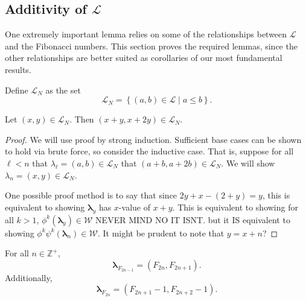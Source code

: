 \documentclass[11pt, letterpaper]{article}
\begin{document}
\subsection{Additivity of $\mathcal{L} $}
One extremely important lemma relies on some of the relationships between $\mathcal{L} $ and the Fibonacci numbers. This section proves the required lemmas, since the other relationships are better suited as corollaries of our most fundamental results.
\begin{definition}\label{dfn:12}
	Define $\mathcal{L} _N$ as the set
	\[
\mathcal{L} _N = \left\{ (a,b)\in \mathcal{L}  \mid a\leq b \right\} 
	.\]	
\end{definition}
\begin{lemma}[Additivity]\label{lma:5}
	Let $(x,y)\in \mathcal{L}_N$. Then $(x+y,x+2y)\in \mathcal{L}_N$.
\end{lemma}
\begin{proof}
	We will use proof by strong induction. Sufficient base cases can be shown to hold via brute force, so consider the inductive case. That is, suppose for all $\ell <n$ that $\lambda_\ell =(a,b)\in \mathcal{L}_N$ that $(a+b,a+2b)\in \mathcal{L}_N$. We will show $\lambda_{n}=\left( x,y \right) \in \mathcal{L}_N$.

	One possible proof method is to say that since $2y+x-(2+y)=y$, this is equivalent to showing $\boldsymbol{\lambda}_y$ has $x$-value of $x+y$. This is equivalent to showing for all $k>1$, $\phi^k( \boldsymbol{\lambda}_y ) \in \mathcal{W} $ NEVER MIND NO IT ISNT. but it IS equivalent to showing $\phi^k\psi^k(\boldsymbol{\lambda}_n)\in \mathcal{W} $. It might be prudent to note that $y=x+n$?
\end{proof}
\begin{lemma}\label{lma:6}
	For all $n\in\mathbb{Z}^+$,
	\[
		\boldsymbol{\lambda}_{F_{2n-1}}=\left( F_{2n},F_{2n+1} \right) 
	.\]
	Additionally,
	\[
		\boldsymbol{\lambda}_{F_{2n}}=\left( F_{2n+1}-1,F_{2n+2}-1 \right) 
	.\]
\end{lemma}
\end{document}
